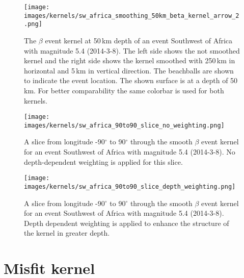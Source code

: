 \begin{figure}[h]
\begin{center}
\texttt{[image: images/kernels/sw\_africa\_smoothing\_50km\_beta\_kernel\_arrow\_2.png]}
\caption[Effects of smoothing on an event kernel]
{The $\beta$ event kernel at 50$\,$km depth of an event 
Southwest of Africa with magnitude 5.4 (2014-3-8).
The left side shows the not smoothed kernel and the
right side shows the kernel smoothed with 250$\,$km in 
horizontal and 5$\,$km in vertical direction.
The beachballs are shown to indicate the event location.
The shown surface is at a depth of 50$\,$km.
For better comparability the same colorbar is used for both kernels.}  
\label{smoothing}
\end{center}
\end{figure}



\begin{figure}[h]
\begin{center}
\texttt{[image: images/kernels/sw\_africa\_90to90\_slice\_no\_weighting.png]}
\caption[Non weighted slice from longitude -90$^\circ$ to 90$^\circ$ through a smooth $\beta$ event kernel]
{A slice from longitude -90$^\circ$ to 90$^\circ$ through the smooth $\beta$ event kernel for an event Southwest of Africa with 
magnitude 5.4 (2014-3-8). 
No depth-dependent weighting is applied for this slice.}  
\label{sw_africa_no_weight}
\texttt{[image: images/kernels/sw\_africa\_90to90\_slice\_depth\_weighting.png]}
\caption[Depth-dependent weighted slice from longitude -90$^\circ$ to 90$^\circ$ through a smooth $\beta$ event kernel]
{A slice from longitude -90$^\circ$ to 90$^\circ$ through the smooth $\beta$ event kernel for an event Southwest of Africa with 
magnitude 5.4 (2014-3-8). 
Depth dependent weighting is applied to enhance the structure of the kernel in greater depth.}  
\label{sw_africa_depth_weight}
\end{center}
\end{figure}

\newpage


\section{Misfit kernel}


